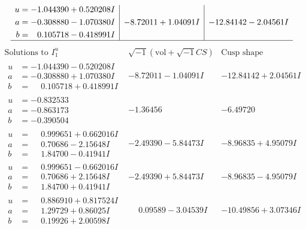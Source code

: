 \documentclass[1p]{elsarticle_modified}
\theoremstyle{definition}
\newcommand{\I}{\sqrt{-1}}
\begin{document}
$$\begin{array}{c|c|c}
\begin{aligned}
u &= -1.044390 + 0.520208 I \\
a &= -0.308880 - 1.070380 I \\
b &= \phantom{-}0.105718 - 0.418991 I\end{aligned}
 & -8.72011 + 1.04091 I & -12.84142 - 2.04561 I\\
 \hline 
 \end{array}$$\newpage$$\begin{array}{c|c|c}  
\text{Solutions to }I^u_{1}& \I (\text{vol} + \sqrt{-1}CS) & \text{Cusp shape}\\
 \hline 
\begin{aligned}
u &= -1.044390 - 0.520208 I \\
a &= -0.308880 + 1.070380 I \\
b &= \phantom{-}0.105718 + 0.418991 I\end{aligned}
 & -8.72011 - 1.04091 I & -12.84142 + 2.04561 I \\ \hline\begin{aligned}
u &= -0.832533\phantom{ +0.000000I} \\
a &= -0.863173\phantom{ +0.000000I} \\
b &= -0.390504\phantom{ +0.000000I}\end{aligned}
 & -1.36456\phantom{ +0.000000I} & -6.49720\phantom{ +0.000000I} \\ \hline\begin{aligned}
u &= \phantom{-}0.999651 + 0.662016 I \\
a &= \phantom{-}0.70686 - 2.15648 I \\
b &= \phantom{-}1.84700 - 0.41941 I\end{aligned}
 & -2.49390 - 5.84473 I & -8.96835 + 4.95079 I \\ \hline\begin{aligned}
u &= \phantom{-}0.999651 - 0.662016 I \\
a &= \phantom{-}0.70686 + 2.15648 I \\
b &= \phantom{-}1.84700 + 0.41941 I\end{aligned}
 & -2.49390 + 5.84473 I & -8.96835 - 4.95079 I \\ \hline\begin{aligned}
u &= \phantom{-}0.886910 + 0.817524 I \\
a &= \phantom{-}1.29729 + 0.86025 I \\
b &= \phantom{-}0.19926 + 2.00598 I\end{aligned}
 & \phantom{-}0.09589 - 3.04539 I & -10.49856 + 3.07346 I \\ \hline\begin{aligned}

\end{aligned}
\end{array}$$
\end{document}
